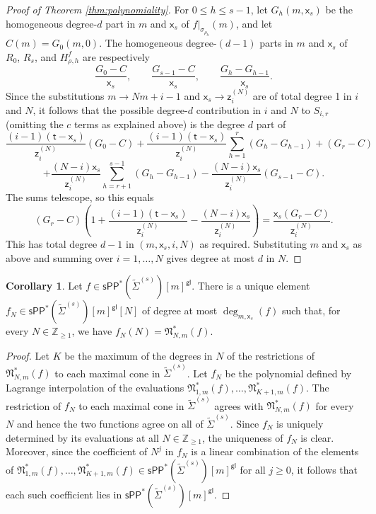 \documentclass[11pt]{article}
\newcommand{\sPP}{\mathsf{sPP}}
\newcommand{\spp}{\sPP}
\theoremstyle{definition}
\newtheorem{corollary}[definition]{Corollary}
\begin{document}
\begin{proof}[Proof of Theorem \ref{thm:polynomiality}]
	For $0\le h\le s-1$, let $G_h(m,\mathsf{x}_s)$ be the homogeneous degree-$d$ part in $m$ and $\mathsf{x}_s$ of $f|_{\sigma_{\rho_h}}(m)$, and let $C(m)=G_0(m,0)$. The homogeneous degree-$(d-1)$ parts in $m$ and $\mathsf{x}_s$ of $R_0$, $R_s$, and $H_{\rho,h}^f$ are respectively
	\[
		\frac{G_0-C}{\mathsf{x}_s},\qquad \frac{G_{s-1}-C}{\mathsf{x}_s},\qquad \frac{G_h-G_{h-1}}{\mathsf{x}_s}.
	\]
	Since the substitutions $m\to Nm+i-1$ and $\mathsf{x}_s\to \mathsf{z}_i^{(N)}$ are of total degree 1 in $i$ and $N$, it follows that the
	possible degree-$d$ contribution in $i$ and $N$ to $S_{i,r}$ (omitting the $c$ terms as explained above) is
	the degree $d$ part of
	\[
		\frac{(i-1)(\mathsf{t}-\mathsf{x}_s)}{\mathsf{z}_i^{(N)}}(G_0-C)
		+\frac{(i-1)(\mathsf{t}-\mathsf{x}_s)}{\mathsf{z}_i^{(N)}}\sum_{h=1}^r(G_h-G_{h-1})
		+(G_r-C)
	\]
	\[
		+\frac{(N-i)\mathsf{x}_s}{\mathsf{z}_i^{(N)}}\sum_{h=r+1}^{s-1}(G_h-G_{h-1})
		-\frac{(N-i)\mathsf{x}_s}{\mathsf{z}_i^{(N)}}(G_{s-1}-C).
	\]
	The sums telescope, so this equals
	\[
		(G_r-C)\left(1+\frac{(i-1)(\mathsf{t}-\mathsf{x}_s)}{\mathsf{z}_i^{(N)}}-\frac{(N-i)\mathsf{x}_s}{\mathsf{z}_i^{(N)}}\right)
		=\frac{\mathsf{x}_s(G_r-C)}{\mathsf{z}_i^{(N)}}.
	\]
	This has total degree $d-1$ in $(m,\mathsf{x}_s,i,N)$ as required. Substituting $m$ and $\mathsf{x}_s$ as above and summing over $i=1,\dots,N$ gives degree at most $d$ in $N$.
\end{proof}

\begin{corollary}
	\label{cor:glob_poly}
	Let $f\in \spp^{\ast}(\tilde{\Sigma}^{(s)})[m]^{\mathsf{gl}}$. There is a unique element
	$f_N\in \spp^{\ast}(\tilde{\Sigma}^{(s)})[m]^{\mathsf{gl}}[N]$ of degree at most $\deg_{m,\mathsf{x}_s}(f)$ such that, for every
	$N\in \mathbb{Z}_{\ge 1}$, we have $f_N(N)=\mathfrak{N}_{N,m}^\ast(f)$.
\end{corollary}

\begin{proof}
	Let $K$ be the maximum of the degrees in $N$ of the restrictions of
	$\mathfrak{N}_{N,m}^\ast(f)$ to each maximal cone in $\tilde{\Sigma}^{(s)}$.
	Let $f_N$ be the polynomial defined by Lagrange interpolation of the
	evaluations $\mathfrak{N}_{1,m}^\ast(f),\dots,\mathfrak{N}_{K+1,m}^\ast(f)$.
	The restriction of $f_N$ to each maximal cone in $\tilde{\Sigma}^{(s)}$
	agrees with $\mathfrak{N}_{N,m}^\ast(f)$ for every $N$ and hence the two
	functions agree on all of $\tilde{\Sigma}^{(s)}$. Since $f_N$ is uniquely
	determined by its evaluations at all $N\in \mathbb{Z}_{\ge 1}$, the
	uniqueness of $f_N$ is clear. Moreover, since the coefficient of $N^{j}$ in
	$f_N$ is a linear combination of the elements of
	$\mathfrak{N}_{1,m}^\ast(f),\dots,\mathfrak{N}_{K+1,m}^\ast(f)\in
	\spp^{\ast}(\tilde{\Sigma}^{(s)})[m]^{\mathsf{gl}}$ for all $j\ge 0$, it follows that
	each such coefficient lies in $\spp^{\ast}(\tilde{\Sigma}^{(s)})[m]^{\mathsf{gl}}$.
\end{proof}
\end{document}
